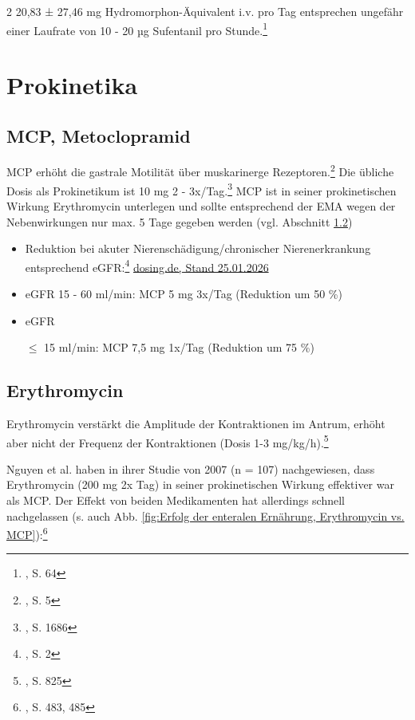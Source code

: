 \documentclass{article}
\begin{document}
\begin{multicols}{2}
  20,83 ± 27,46 mg Hydromorphon-Äquivalent i.v. pro Tag entsprechen ungefähr einer Laufrate von 10 - 20 µg Sufentanil pro Stunde.\footnote{\cite{freye2002OpioideMedizin}, S. 64}

  \section{Prokinetika}%
  \label{sec:Prokinetika}

  \subsection{MCP, Metoclopramid}%
  \label{sub:MCP, Metoclopramid}
  MCP erhöht die gastrale Motilität über muskarinerge Rezeptoren.\footnote{\cite{rahat-dahmardeh2021ComparingEffectNeostigmine}, S. 5} Die übliche Dosis als Prokinetikum ist 10 mg 2 - 3x/Tag.\footnote{\cite{singer2023ESPENPracticalPartially}, S. 1686} MCP ist in seiner prokinetischen Wirkung Erythromycin unterlegen und sollte entsprechend der EMA wegen der Nebenwirkungen nur max. 5 Tage gegeben werden (vgl. Abschnitt \ref{sub:Erythromycin}) 

  \begin{itemize}
    \item[-] Reduktion bei akuter Nierenschädigung/chronischer Nierenerkrankung entsprechend eGFR:\footnote{\cite{MCPratiopharm10Mg}, S. 2} \href{https://dosing.de/popup_niere.php?monoid=450}{dosing.de, Stand 25.01.2026}
    \item[-] eGFR 15 - 60 ml/min: MCP 5 mg 3x/Tag (Reduktion um 50 \%)
    \item[-] eGFR $\leq$ 15 ml/min: MCP 7,5 mg 1x/Tag (Reduktion um 75 \%)
  \end{itemize}

  \subsection{Erythromycin}%
  \label{sub:Erythromycin}
  Erythromycin verstärkt die Amplitude der Kontraktionen im Antrum, erhöht aber nicht der Frequenz der Kontraktionen (Dosis 1-3 mg/kg/h).\footnote{\cite{annese1992ErythromycinAcceleratesGastric}, S. 825} 

  Nguyen et al. haben in ihrer Studie von 2007 (n = 107) nachgewiesen, dass Erythromycin (200 mg 2x Tag) in seiner prokinetischen Wirkung effektiver war als MCP. Der Effekt von beiden Medikamenten hat allerdings schnell nachgelassen (s. auch Abb. \ref{fig:Erfolg der enteralen Ernährung, Erythromycin vs. MCP}):\footnote{\cite{nguyen2007ErythromycinMoreEffective}, S. 483, 485} 


\end{multicols}
\end{document}
